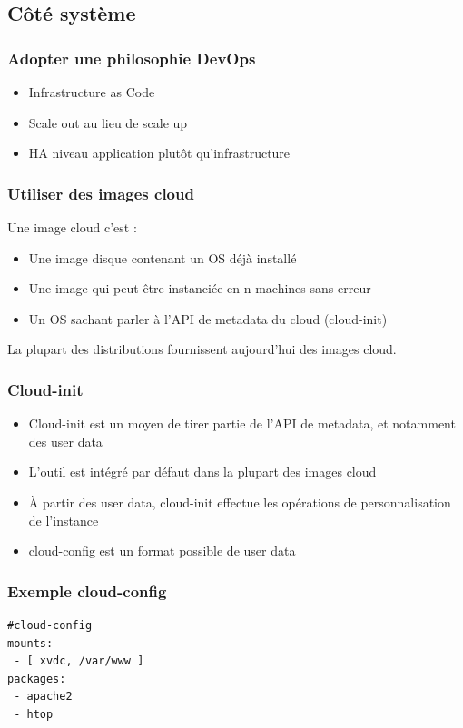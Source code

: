   \subsection{Côté système}

  \begin{frame}
    \frametitle{Adopter une philosophie DevOps}
    \begin{itemize}
      \item Infrastructure as Code
      \item Scale out au lieu de scale up
      \item HA niveau application plutôt qu'infrastructure
    \end{itemize}
  \end{frame}

  \begin{frame}
    \frametitle{Utiliser des images cloud}
    Une image cloud c'est :
    \begin{itemize}
      \item Une image disque contenant un OS déjà installé
      \item Une image qui peut être instanciée en n machines sans erreur
      \item Un OS sachant parler à l'API de metadata du cloud (cloud-init)
    \end{itemize}
    La plupart des distributions fournissent aujourd'hui des images cloud.
  \end{frame}

  \begin{frame}
    \frametitle{Cloud-init}
    \begin{itemize}
      \item Cloud-init est un moyen de tirer partie de l'API de metadata, et notamment des user data
      \item L'outil est intégré par défaut dans la plupart des images cloud
      \item À partir des user data, cloud-init effectue les opérations de personnalisation de l'instance
      \item cloud-config est un format possible de user data
    \end{itemize}
  \end{frame}

  \begin{frame}[containsverbatim]
    \frametitle{Exemple cloud-config}
\begin{verbatim}
#cloud-config
mounts:
 - [ xvdc, /var/www ]
packages:
 - apache2
 - htop
\end{verbatim}
  \end{frame}

